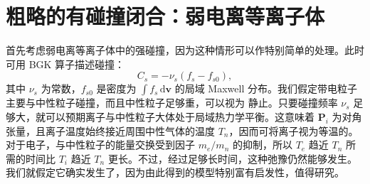 \section{粗略的有碰撞闭合：弱电离等离子体}
首先考虑弱电离等离子体中的强碰撞，因为这种情形可以作特别简单的处理。此时可用 BGK 算子描述碰撞：
\begin{equation}
C_s=-\nu_s(f_s-f_{s0}),
\tag{L7-6}\label{eq:L7:6}
\end{equation}
其中 $\nu_s$ 为常数，$f_{s0}$ 是密度为 $\int f_s\,\mathrm d\boldsymbol v$ 的局域 Maxwell 分布。我们假定带电粒子主要与中性粒子碰撞，而且中性粒子足够重，可以视为
静止。只要碰撞频率 $\nu_s$ 足够大，就可以预期离子与中性粒子大体处于局域热力学平衡。这意味着 $\boldsymbol P_i$ 为对角张量，且离子温度始终接近周围中性气体的温度 $T_n$，因而可将离子视为等温的。对于电子，与中性粒子的能量交换受到因子 $m_e/m_n$ 的抑制，所以 $T_e$ 趋近 $T_n$ 所需的时间比 $T_i$ 趋近 $T_n$ 更长。不过，经过足够长时间，这种弛豫仍然能够发生。我们就假定它确实发生了，因为由此得到的模型特别富有启发性，值得研究。

